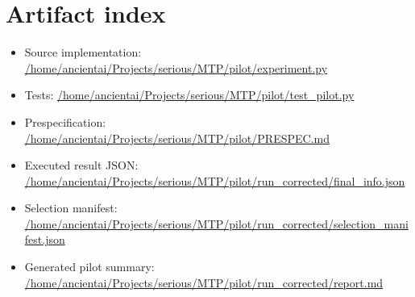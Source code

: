 \documentclass[11pt,a4paper]{article}
\begin{document}
\appendix
\section{Artifact index}
\begin{itemize}
\item Source implementation: \url{/home/ancientai/Projects/serious/MTP/pilot/experiment.py}
\item Tests: \url{/home/ancientai/Projects/serious/MTP/pilot/test_pilot.py}
\item Prespecification: \url{/home/ancientai/Projects/serious/MTP/pilot/PRESPEC.md}
\item Executed result JSON: \url{/home/ancientai/Projects/serious/MTP/pilot/run_corrected/final_info.json}
\item Selection manifest: \url{/home/ancientai/Projects/serious/MTP/pilot/run_corrected/selection_manifest.json}
\item Generated pilot summary: \url{/home/ancientai/Projects/serious/MTP/pilot/run_corrected/report.md}
\end{itemize}



\end{document}
